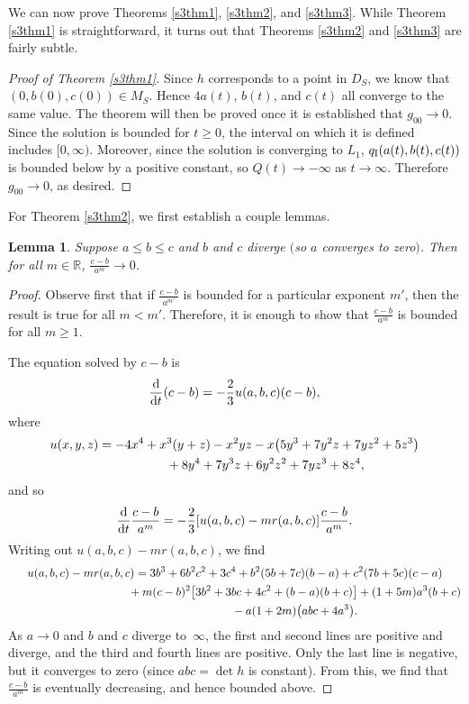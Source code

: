\documentclass[10pt,a4paper]{amsart}
\numberwithin{equation}{section}
\newtheorem{Lemma}[Theorem]{Lemma}
\newcommand{\dtime}{\frac{{\rm d}}{{\rm d} t}} %
\begin{document}
We can now prove Theorems \ref{s3thm1}, \ref{s3thm2}, and \ref{s3thm3}. While Theorem \ref{s3thm1} is straightforward, it turns out that Theorems \ref{s3thm2} and \ref{s3thm3} are fairly subtle.

\begin{proof}[Proof of Theorem \ref{s3thm1}]
Since $h$ corresponds to a point in $D_S$, we know that $(0, b(0), c(0)) \in M_S$. Hence $4a(t)$, $b(t)$, and $c(t)$ all converge to the same value. The theorem will then be proved once it is established that $g_{00} \rightarrow 0$. Since the solution is bounded for $t \geq 0$, the interval on which it is defined includes $[0, \infty)$. Moreover, since the solution is converging to $L_1$, $q_{\rm I}(a(t), b(t), c(t))$ is bounded below by a positive constant, so $Q(t) \rightarrow -\infty$ as $t \rightarrow \infty$. Therefore $g_{00} \rightarrow 0$, as desired.
\end{proof}

For Theorem \ref{s3thm2}, we first establish a couple lemmas.

\begin{Lemma} \label{s3azerobcinfinitylemma1}
Suppose $a \leq b \leq c$ and $b$ and $c$ diverge $($so $a$ converges to zero$)$. Then for all $m \in \mathbb{R}$, $\frac{c - b}{a^m} \rightarrow 0$.
\end{Lemma}

\begin{proof}
Observe first that if $\frac{c - b}{a^{m'}}$ is bounded for a particular exponent $m'$, then the result is true for all $m < m'$. Therefore, it is enough to show that $\frac{c - b}{a^{m}}$ is bounded for all $m \geq 1$.

The equation solved by $c - b$ is
\[
\dtime(c - b) = -\frac{2}{3} u(a, b, c)(c - b),
\]
where
\begin{gather*}
u(x, y, z) = -4x^4 + x^3(y + z) - x^2yz -x\big(5y^3 + 7y^2 z + 7yz^2 + 5z^3\big) \\
\hphantom{u(x, y, z) =}{} + 8y^4 + 7y^3z + 6y^2z^2 + 7yz^3 + 8z^4,
\end{gather*}
and so
\[
\dtime \frac{c - b}{a^m} = -\frac{2}{3} [u(a, b, c) - m r(a, b, c)] \frac{c-b}{a^m}.
\]
Writing out $u(a, b, c) - m r(a, b, c)$, we find
\begin{gather*}
u(a, b, c) - m r(a, b, c) = 3b^3 + 6b^2 c^2 + 3c^4
					 + b^2(5b + 7c)(b - a) + c^2(7b + 5c)(c - a) \\
\hphantom{u(a, b, c) - m r(a, b, c) =}{} + m(c - b)^2\big[3b^2 + 3bc + 4c^2 + (b-a)(b+c)\big]
					 + (1+5m)a^3(b+c) \\
\hphantom{u(a, b, c) - m r(a, b, c) =}{} - a(1+2m)\big(abc + 4a^3\big).
\end{gather*}
As $a \rightarrow 0$ and $b$ and $c$ diverge to~$\infty$, the first and second lines are positive and diverge, and the third and fourth lines are positive. Only the last line is negative, but it converges to zero (since $abc = \det h$ is constant). From this, we find that $\frac{c - b}{a^m}$ is eventually decreasing, and hence bounded above.
\end{proof}
\end{document}
